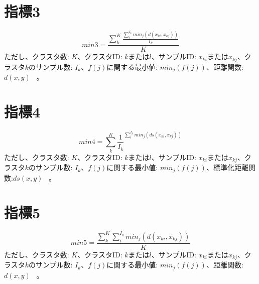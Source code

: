 \documentclass{article}
\begin{document}
\section{指標3}
\begin{equation}
min3=\frac{\sum_{k}^{K}{\frac{\sum_{i}^{I_k}{min_j(d(x_{ki},x_{kj}))}}{I_k}}}{K}
\end{equation}
ただし、クラスタ数: $K$、クラスタID: $k$または$l$、サンプルID: $x_{ki}$または$x_{kj}$、クラスタ$k$のサンプル数: $I_k$、$f(j)$に関する最小値: $min_j(f(j))$、距離関数:$d(x,y)$  \ 。

\section{指標4}
\begin{equation}
min4={\sum_{k}^{K}{{\frac{1}{I_k}}^{\sum_{i}^{I_k}{min_j(ds(x_{ki},x_{kj}))}}}}
\end{equation}
ただし、クラスタ数: $K$、クラスタID: $k$または$l$、サンプルID: $x_{ki}$または$x_{kj}$、クラスタ$k$のサンプル数: $I_k$、$f(j)$に関する最小値: $min_j(f(j))$、標準化距離関数:$ds(x,y)$  \ 。

\section{指標5}
\begin{equation}
min5=\frac{ \sum_{k}^{K}{ \sum_{i}^{I_k}{min_j(d(x_{ki},x_{kj}))}  }  }{K}
\end{equation}
ただし、クラスタ数: $K$、クラスタID: $k$または$l$、サンプルID: $x_{ki}$または$x_{kj}$、クラスタ$k$のサンプル数: $I_k$、$f(j)$に関する最小値: $min_j(f(j))$、距離関数:$d(x,y)$  \ 。
\end{document}
